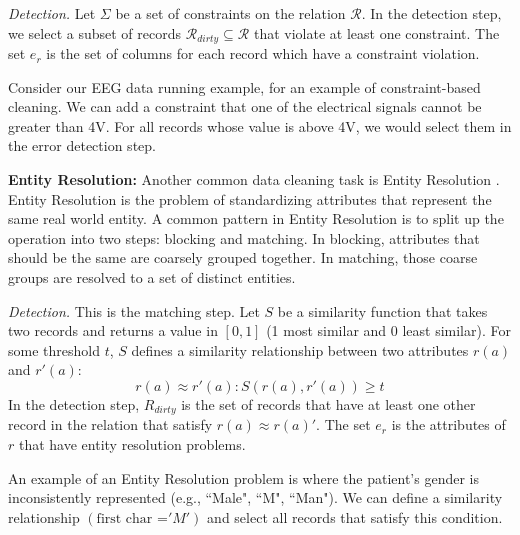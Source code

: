 \vspace{0.5em}

\emph{Detection. } Let $\Sigma$ be a set of constraints on the relation $\mathcal{R}$. 
In the detection step, we select a subset of records $\mathcal{R}_{dirty} \subseteq \mathcal{R}$ that violate at least one constraint.
The set $e_r$ is the set of columns for each record which have a constraint violation. 

\begin{example}
Consider our EEG data running example, for an example of constraint-based cleaning.
We can add a constraint that one of the electrical signals cannot be greater than 4V.
For all records whose value is above 4V, we would select them in the error detection step.
\end{example}

\vspace{0.5em}

\noindent\textbf{Entity Resolution: }
Another common data cleaning task is Entity Resolution \cite{gokhale2014corleone, DBLP:journals/pvldb/KopckeTR10, wang2012crowder}.
Entity Resolution is the problem of standardizing attributes that represent the same real world entity.
A common pattern in Entity Resolution is to split up the operation into two steps: blocking and matching.
In blocking, attributes that should be the same are coarsely grouped together.
In matching, those coarse groups are resolved to a set of distinct entities.

\vspace{0.5em}

\emph{Detection. } This is the matching step. Let $S$ be a similarity function that takes two records and returns a value in $[0,1]$ (1 most similar and 0 least similar). For some threshold $t$, $S$ defines a similarity relationship between two attributes $r(a)$ and $r'(a)$:
\[
r(a) \approx r'(a) : S(r(a),r'(a)) \ge t
\] 
In the detection step, $R_{dirty}$ is the set of records that have at least one other record in the relation that satisfy $r(a) \approx r(a)'$.
The set $e_r$ is the attributes of $r$ that have entity resolution problems.

\begin{example}
An example of an Entity Resolution problem is where the patient's gender is inconsistently represented (e.g., ``Male", ``M", ``Man"). 
We can define a similarity relationship $(\text{first char =} 'M')$ and select all records that satisfy this condition.
\end{example}

